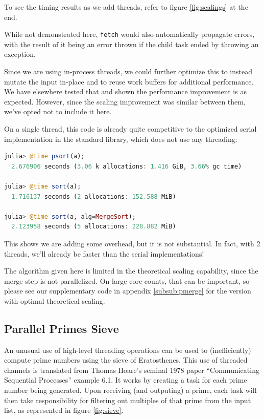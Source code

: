 \documentclass{juliacon}
\begin{document}
To see the timing results as we add threads, refer to figure \ref{fig:scalings} at the end.

While not demonstrated here, \verb|fetch| would also automatically propagate errors, with the result of it being an error thrown if the child task ended by throwing an exception.

Since we are using in-process threads, we could further optimize this to instead mutate the input in-place and to reuse work buffers for additional performance. We have elsewhere tested that and shown the performance improvement is as expected. However, since the scaling improvement was similar between them, we've opted not to include it here.

On a single thread, this code is already quite competitive to the optimized serial implementation in the standard library, which does not use any threading:

\begin{lstlisting}[language = Julia]
julia> @time psort(a);
  2.676906 seconds (3.06 k allocations: 1.416 GiB, 3.66% gc time)

julia> @time sort(a);
  1.716137 seconds (2 allocations: 152.588 MiB)

julia> @time sort(a, alg=MergeSort);
  2.123958 seconds (5 allocations: 228.882 MiB)
\end{lstlisting}

This shows we are adding some overhead, but it is not substantial. In fact, with 2 threads, we'll already be faster than the serial implementations!

The algorithm given here is limited in the theoretical scaling capability, since the merge step is not parallelized. On large core counts, that can be important, so please see our supplementary code in appendix \ref{subsub:pmerge} for the version with optimal theoretical scaling.

\subsection{Parallel Primes Sieve}
\label{subsub:pprimes}

An unusual use of high-level threading operations can be used to (inefficiently) compute prime numbers using the sieve of Eratosthenes.
This use of threaded channels is translated from Thomas Hoare's seminal 1978 paper ``Communicating Sequential Processes''\cite{Hoare:1978:CSP:359576.359585} example 6.1. It works by creating a task for each prime number being generated. Upon receiving (and outputing) a prime, each task will then take responsibility for filtering out multiples of that prime from the input list, as represented in figure \ref{fig:sieve}.
\end{document}
